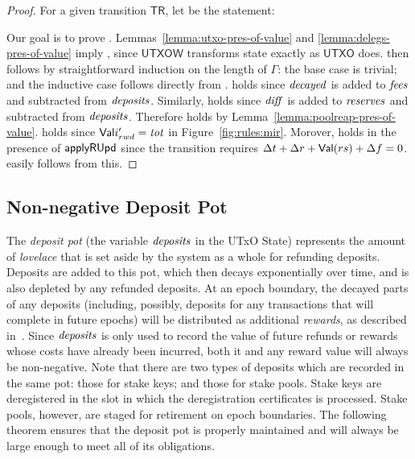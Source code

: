 \begin{proof}
  For a given transition $\mathsf{TR}$, let 
  be the statement:


  \noindent
  Our goal is to prove .
  Lemmas~\ref{lemma:utxo-pres-of-value} and \ref{lemma:delegs-pres-of-value} imply ,
  since $\mathsf{UTXOW}$ transforms state exactly as $\mathsf{UTXO}$ does.
   then follows by straightforward induction on the length of $\Gamma$:
  the base case is trivial;
  and the inductive case follows directly from .
%
   holds since $\mathit{decayed}$ is added to $\mathit{fees}$
  and subtracted from $\mathit{deposits}$.
  Similarly,  holds since $\mathit{diff}$ is added to $\mathit{reserves}$
  and subtracted from $\mathit{deposits}$.
  Therefore  holds by Lemma~\ref{lemma:poolreap-pres-of-value}.
   holds since
  $\mathsf{Val}{i_{rwd}'}=\mathit{tot}$ in Figure~\ref{fig:rules:mir}.
  Morover,  holds in the presence of $\mathsf{applyRUpd}$
  since the transition requires $\Delta t + \Delta r + \mathsf{Val}(rs) + \Delta f = 0$.
   easily follows from this.
\end{proof}

\subsection{Non-negative Deposit Pot}
\label{sec:non-negative-deposit-pot}

The \emph{deposit pot} (the variable $\mathit{deposits}$ in the UTxO State)
represents the amount of \emph{lovelace} that is set aside by the system as a whole for refunding deposits.
Deposits are added to this pot, which then decays exponentially over time,
and is also depleted by any refunded deposits.
At an epoch boundary, the decayed parts of any deposits (including, possibly, deposits for any transactions that will complete in future epochs)
will be distributed as additional \emph{rewards}, as described in~\cite{delegation_design}.
Since $\mathit{deposits}$ is only used to record the value of future refunds or rewards whose costs have
already been incurred, both it and any reward value will always be non-negative.
Note that there are two types of deposits which are recorded in the same pot: those for stake keys; and those for stake pools.
Stake keys are deregistered in the slot in which the deregistration certificates
is processed. Stake pools, however, are staged for retirement on epoch boundaries.
%
The following theorem ensures that the deposit pot is properly maintained
and will always be large enough to meet all of its obligations.


